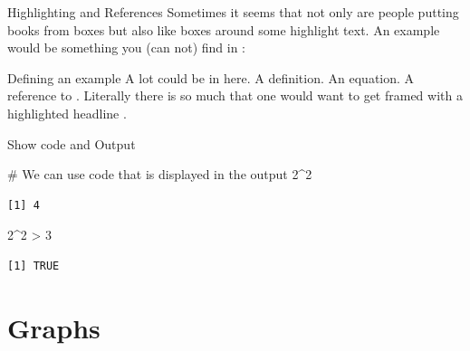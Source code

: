 \documentclass[11pt, aspectratio=169, t]{beamer}
\newenvironment{Shaded}{\begin{snugshade}}{\end{snugshade}}
\newcommand{\CommentTok}[1]{\textcolor[rgb]{0.37,0.37,0.37}{#1}}
\newcommand{\DecValTok}[1]{\textcolor[rgb]{0.68,0.00,0.00}{#1}}
\newcommand{\SpecialCharTok}[1]{\textcolor[rgb]{0.37,0.37,0.37}{#1}}
\begin{document}
\begin{frame}{Highlighting and References}
\label{highlighting-and-references}
Sometimes it seems that not only are people putting books from boxes but
also like boxes around some highlight text. An example would be
something you (can not) find in \textcite[LancetDH]{stern2022}:

\begin{exampleblock}{Defining an example}
\normalsize A lot could be in here. A definition. An equation.  A reference to \textcite[REStud]{abadieSemiparametric2005}. Literally there is so much that one would want to get framed with a highlighted headline \autocites[LancetDH]{stern2022}[REStud]{abadieSemiparametric2005}. 
\end{exampleblock}
\end{frame}

\begin{frame}[fragile]{Show code and Output}
\label{show-code-and-output}
\begin{Shaded}
\begin{Highlighting}[]
\CommentTok{\# We can use code that is displayed in the output}
\DecValTok{2}\SpecialCharTok{\^{}}\DecValTok{2}
\end{Highlighting}
\end{Shaded}

\begin{verbatim}
[1] 4
\end{verbatim}

\begin{Shaded}
\begin{Highlighting}[]
\DecValTok{2}\SpecialCharTok{\^{}}\DecValTok{2} \SpecialCharTok{\textgreater{}} \DecValTok{3}
\end{Highlighting}
\end{Shaded}

\begin{verbatim}
[1] TRUE
\end{verbatim}
\end{frame}

\section{Graphs}\label{graphs}
\end{document}
